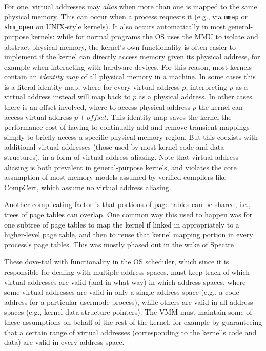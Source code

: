 For one, virtual addresses may \emph{alias} when more than one is mapped to the same physical memory. This can occur when a process requests it (e.g., via \texttt{mmap} or \texttt{shm\_open} on UNIX-style kernels). It also occurs automatically in most general-purpose kernels: while for normal programs the OS uses the MMU to isolate and abstract physical memory, the kernel's own functionality is often easier to implement if the kernel can directly access memory given its physical address, for example when interacting with hardware devices. For this reason, most kernels contain an \emph{identity map} of all physical memory in a machine. In some cases this is a literal identity map, where for every virtual address $p$, interpreting $p$ as a virtual address instead will map back to $p$ as a physical address. In other cases there is an offset involved, where to access physical address $p$ the kernel can access virtual address $p+\mathit{offset}$. This identity map saves the kernel the performance cost of having to continually add and remove transient mappings simply to briefly access a specific physical memory region. But this coexists with additional virtual addresses (those used by most kernel code and data structures), in a form of virtual address aliasing. Note that virtual address aliasing is both prevalent in general-purpose kernels, and violates the core assumption of most memory models assumed by verified compilers like CompCert, which assume no virtual address aliasing.

Another complicating factor is that portions of page tables can be shared, i.e., trees of page tables can overlap. One common way this used to happen was for one subtree of page tables to map the kernel if linked in appropriately to a higher-level page table, and then to reuse that kernel mapping portion in every process's page tables. This was mostly phased out in the wake of Spectre

These dove-tail with functionality in the OS scheduler, which since it is responsible for dealing with multiple address spaces, must keep track of which virtual addresses are valid (and in what way) in which address spaces, where some virtual addresses are valid in only a single address space (e.g., a code address for a particular usermode process), while others are valid in all address spaces (e.g., kernel data structure pointers). The VMM must maintain some of these assumptions on behalf of the rest of the kernel, for example by guaranteeing that a certain range of virtual addresses (corresponding to the kernel's code and data) are valid in every address space.

